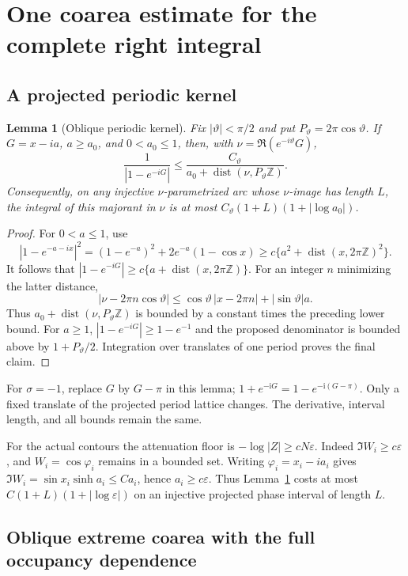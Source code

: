 \documentclass[11pt]{article}
\numberwithin{equation}{section}
\newtheorem{lemma}[theorem]{Lemma}
\theoremstyle{remark}\newtheorem{remark}[theorem]{Remark}
\newcommand{\ii}{\mathrm i}
\begin{document}
\section{One coarea estimate for the complete right integral}\label{sec:global-integration}
\subsection{A projected periodic kernel}
\begin{lemma}[Oblique periodic kernel]\label{lem:oblique-kernel}
Fix $|\vartheta|<\pi/2$ and put $P_\vartheta=2\pi\cos\vartheta$.
If $G=x-ia$, $a\ge a_0$, and $0<a_0\le1$, then, with
$\nu=\Re(e^{-i\vartheta}G)$,
\[
 \frac1{|1-e^{-iG}|}
 \le \frac{C_\vartheta}
 {a_0+\operatorname{dist}(\nu,P_\vartheta\mathbb Z)}.
\]
Consequently, on any injective $\nu$-parametrized arc whose
$\nu$-image has length $L$, the integral of this majorant in $\nu$
is at most $C_\vartheta(1+L)(1+|\log a_0|)$.
\end{lemma}
\begin{proof}
For $0<a\le1$, use
\[
 |1-e^{-a-ix}|^2=(1-e^{-a})^2+2e^{-a}(1-\cos x)
 \ge c\{a^2+\operatorname{dist}(x,2\pi\mathbb Z)^2\}.
\]
It follows that
$|1-e^{-iG}|\ge c\{a+\operatorname{dist}(x,2\pi\mathbb Z)\}$.
For an integer $n$ minimizing the latter distance,
\[
 |\nu-2\pi n\cos\vartheta|
 \le\cos\vartheta\,|x-2\pi n|+|\sin\vartheta|a.
\]
Thus $a_0+\operatorname{dist}(\nu,P_\vartheta\mathbb Z)$ is
bounded by a constant times the preceding lower bound.
For $a\ge1$, $|1-e^{-iG}|\ge1-e^{-1}$ and the proposed
denominator is bounded above by $1+P_\vartheta/2$.
Integration over translates of one period proves the final claim.
\end{proof}


For $\sigma=-1$, replace $G$ by $G-\pi$ in this lemma;
$1+e^{-\ii G}=1-e^{-\ii(G-\pi)}$. Only a fixed translate of
the projected period lattice changes. The derivative, interval length,
and all bounds remain the same.

For the actual contours the attenuation floor is
$-\log|Z|\ge cN\varepsilon$. Indeed $\Im W_i\ge c\varepsilon$,
and $W_i=\cos\varphi_i$ remains in a bounded set. Writing
$\varphi_i=x_i-ia_i$ gives
$\Im W_i=\sin x_i\sinh a_i\le C a_i$, hence
$a_i\ge c\varepsilon$. Thus Lemma~\ref{lem:oblique-kernel}
costs at most $C(1+L)(1+|\log\varepsilon|)$ on an injective
projected phase interval of length $L$.

\subsection{Oblique extreme coarea with the full occupancy dependence}
\end{document}
